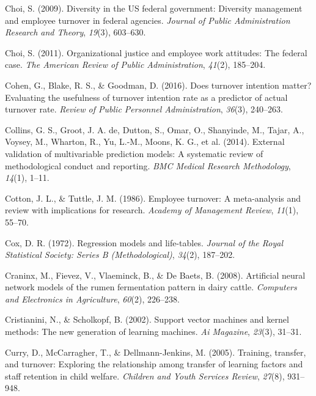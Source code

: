 \documentclass[
  man]{apa7}
\newlength{\cslhangindent}
\newlength{\cslentryspacingunit} %
\newenvironment{CSLReferences}[2] %
 {%
  \setlength{\parindent}{0pt}
  \ifodd #1
  \let\oldpar\par
  \def\par{\hangindent=\cslhangindent\oldpar}
  \fi
  \setlength{\parskip}{#2\cslentryspacingunit}
 }%
 {}
\begin{document}
\begin{CSLReferences}{1}{0}
\leavevmode{}%
Choi, S. (2009). Diversity in the US federal government: Diversity management and employee turnover in federal agencies. \emph{Journal of Public Administration Research and Theory}, \emph{19}(3), 603--630.

\leavevmode{}%
Choi, S. (2011). Organizational justice and employee work attitudes: The federal case. \emph{The American Review of Public Administration}, \emph{41}(2), 185--204.

\leavevmode{}%
Cohen, G., Blake, R. S., \& Goodman, D. (2016). Does turnover intention matter? Evaluating the usefulness of turnover intention rate as a predictor of actual turnover rate. \emph{Review of Public Personnel Administration}, \emph{36}(3), 240--263.

\leavevmode{}%
Collins, G. S., Groot, J. A. de, Dutton, S., Omar, O., Shanyinde, M., Tajar, A., Voysey, M., Wharton, R., Yu, L.-M., Moons, K. G., et al. (2014). External validation of multivariable prediction models: A systematic review of methodological conduct and reporting. \emph{BMC Medical Research Methodology}, \emph{14}(1), 1--11.

\leavevmode{}%
Cotton, J. L., \& Tuttle, J. M. (1986). Employee turnover: A meta-analysis and review with implications for research. \emph{Academy of Management Review}, \emph{11}(1), 55--70.

\leavevmode{}%
Cox, D. R. (1972). Regression models and life-tables. \emph{Journal of the Royal Statistical Society: Series B (Methodological)}, \emph{34}(2), 187--202.

\leavevmode{}%
Craninx, M., Fievez, V., Vlaeminck, B., \& De Baets, B. (2008). Artificial neural network models of the rumen fermentation pattern in dairy cattle. \emph{Computers and Electronics in Agriculture}, \emph{60}(2), 226--238.

\leavevmode{}%
Cristianini, N., \& Scholkopf, B. (2002). Support vector machines and kernel methods: The new generation of learning machines. \emph{Ai Magazine}, \emph{23}(3), 31--31.

\leavevmode{}%
Curry, D., McCarragher, T., \& Dellmann-Jenkins, M. (2005). Training, transfer, and turnover: Exploring the relationship among transfer of learning factors and staff retention in child welfare. \emph{Children and Youth Services Review}, \emph{27}(8), 931--948.


\end{CSLReferences}
\end{document}
